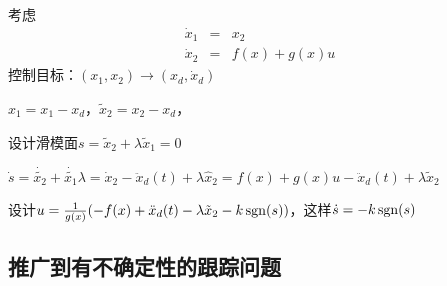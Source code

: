 考虑
\[ \begin{array}{ccc}
     \dot{x}_1 & = & x_2\\
     \dot{x}_2 & = & f (x) + g (x) u
   \end{array} \]
控制目标：$(x_1, x_2) \rightarrow (x_d, \dot{x}_d)$

$\hat{x}_1 = x_1 - x_d$，$\tilde{x}_2 = x_2 - x_d$，

设计滑模面$s = \tilde{x}_2 + \lambda \tilde{x}_1 = 0$

$\dot{s} = \dot{\widetilde{x_2}} + \dot{\widetilde{x_1}} \lambda = \dot{x}_2 -
\ddot{x}_d (t) + \lambda \hat{x}_2 = f (x) + g (x) u - \ddot{x}_d (t) +
\lambda \tilde{x}_2$

设计$u = \frac{1}{g (x)} (- f (x) + \ddot{x}_d (t) - \lambda \tilde{x}_2 - k
\operatorname{sgn} (s))$，这样$\dot{s} = - k \operatorname{sgn} (s)$

\subsection{推广到有不确定性的跟踪问题}